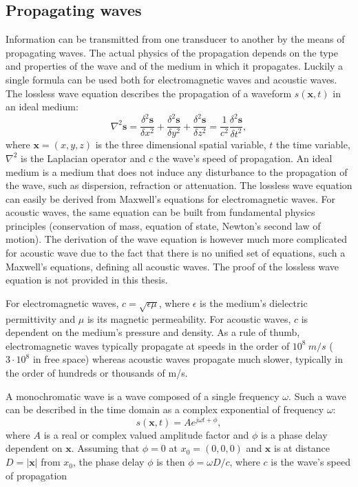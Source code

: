 \subsection{Propagating waves}
\label{sec:prop_waves}
Information can be transmitted from one transducer to another by the means of propagating waves. The actual physics of the propagation depends on the type and properties of the wave and of the medium in which it propagates. Luckily a single formula can be used both for electromagnetic waves and acoustic waves. The lossless wave equation describes the propagation of a waveform $s(\boldsymbol{x}, t)$ in an ideal medium:
\begin{equation}
    \nabla^2 \boldsymbol{s} = \frac{\delta^2 \boldsymbol{s}}{\delta x^2} + \frac{\delta^2 \boldsymbol{s}}{\delta y^2} + \frac{\delta^2 \boldsymbol{s}}{\delta z^2} = \frac{1}{c^2} \frac{\delta^2 \boldsymbol{s}}{\delta t^2},
\end{equation}
\noindent
where $\boldsymbol{x} = (x, y, z)$ is the three dimensional spatial variable, $t$ the time variable, $\nabla^2$ is the Laplacian operator and $c$ the wave's speed of propagation. An ideal medium is a medium that does not induce any disturbance to the propagation of the wave, such as dispersion, refraction or attenuation. The lossless wave equation can easily be derived from Maxwell's equations for electromagnetic waves. For acoustic waves, the same equation can be built from fundamental physics principles (conservation of mass, equation of state, Newton's second law of motion). The derivation of the wave equation is however much more complicated for acoustic wave due to the fact that there is no unified set of equations, such a Maxwell's equations, defining all acoustic waves. The proof of the lossless wave equation is not provided in this thesis.

For electromagnetic waves, $c = \sqrt{\epsilon \mu}$, where $\epsilon$ is the medium's dielectric permittivity and $\mu$ is its magnetic permeability. For acoustic waves, $c$ is dependent on the medium's pressure and density.
As a rule of thumb, electromagnetic waves typically propagate at speeds in the order of $10^8 ~ m/s$  ($3 \cdot 10^8$ in free space) whereas acoustic waves propagate much slower, typically in the order of hundreds or thousands of m/s.

A monochromatic wave is a wave composed of a single frequency $\omega$. Such a wave can be described in the time domain as a complex exponential of frequency $\omega$:
\begin{equation}
    s(\boldsymbol{x},t) = A e^{j \omega t + \phi},
\label{eq:mono_wave}
\end{equation}
\noindent
where $A$ is a real or complex valued amplitude factor and $\phi$ is a phase delay dependent on $\boldsymbol{x}$.
Assuming that $\phi = 0$ at $x_0 = (0, 0, 0)$ and $\boldsymbol{x}$ is at distance $D = |\boldsymbol{x}|$ from $x_0$, the phase delay $\phi$ is then $\phi = \omega D / c$, where $c$ is the wave's speed of propagation

